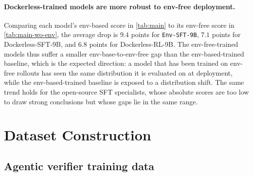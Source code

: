 \documentclass{llmxive}
\providecommand{\approach}{Dockerless\xspace}
\begin{document}
\paragraph{\approach-trained models are more robust to env-free deployment.}
Comparing each model's env-based score in \cref{tab:main} to its env-free score in \cref{tab:main-wo-env}, the average drop is $9.4$ points for \texttt{Env-SFT-9B}, $7.1$ points for \approach-SFT-9B, and $6.8$ points for \approach-RL-9B.
The env-free-trained models thus suffer a smaller env-base-to-env-free gap than the env-based-trained baseline, which is the expected direction: a model that has been trained on env-free rollouts has seen the same distribution it is evaluated on at deployment, while the env-based-trained baseline is exposed to a distribution shift.
The same trend holds for the open-source SFT specialists, whose absolute scores are too low to draw strong conclusions but whose gaps lie in the same range.


\section{Dataset Construction}
\label{app:data}

\subsection{Agentic verifier training data}
\label{app:data-verifier}
\end{document}
